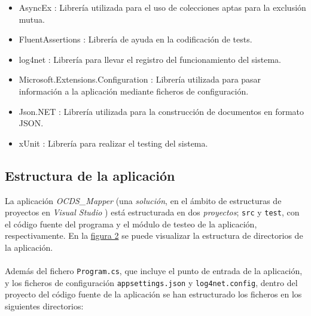             \begin{itemize}
                \item AsyncEx \cite{LIBASYNC}: Librería utilizada para el uso de colecciones aptas para la exclusión mutua.
                \item FluentAssertions \cite{LIBASSERT}: Librería de ayuda en la codificación de tests.
                \item log4net \cite{LIBLOG4}: Librería para llevar el registro del funcionamiento del sistema.
                \item Microsoft.Extensions.Configuration \cite{LIBCONFIG}: Librería utilizada para pasar información a la aplicación mediante ficheros de configuración.
                \item Json.NET \cite{LIBJSON}: Librería utilizada para la construcción de documentos en formato JSON.
                \item xUnit \cite{LIBXUNIT}: Librería para realizar el testing del sistema.
            \end{itemize}   
    
    \subsection{Estructura de la aplicación}
        La aplicación \textit{OCDS\_Mapper} (una \textit{solución}, en el ámbito de estructuras de proyectos en \textit{Visual Studio} \cite{VSPROJSOL}) está estructurada en dos \textit{proyectos}; \texttt{src} y \texttt{test}, con el código fuente del programa y el módulo de testeo de la aplicación, respectivamente. En la \hyperref[fig:estructura]{figura 2} se puede visualizar la estructura de directorios de la aplicación.
        \\ \\
        Además del fichero \texttt{Program.cs}, que incluye el punto de entrada de la aplicación, y los ficheros de configuración \texttt{appsettings.json} y \texttt{log4net.config}, dentro del proyecto del código fuente de la aplicación se han estructurado los ficheros en los siguientes directorios:
        
